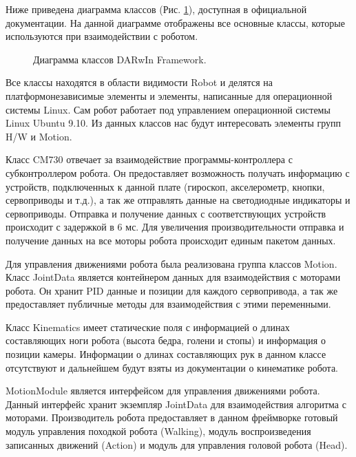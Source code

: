 Ниже приведена диаграмма классов (Рис. \ref{im:1_framework_class_diagram}), доступная в официальной документации. На данной диаграмме отображены все основные классы, которые используются при взаимодействии с роботом. %

\begin{figure}[h]
\caption{Диаграмма классов DARwIn Framework.}
\label{im:1_framework_class_diagram}
\end{figure}

Все классы находятся в области видимости Robot и делятся на платформонезависимые элементы и элементы, написанные для операционной системы Linux. Сам робот работает под управлением операционной системы Linux Ubuntu 9.10. Из данных классов нас будут интересовать элементы групп H/W и Motion.

Класс CM730 отвечает за взаимодействие программы-контроллера с субконтроллером робота. Он предоставляет возможность получать информацию с устройств, подключенных к данной плате (гироскоп, акселерометр, кнопки, сервоприводы и т.д.), а так же отправлять данные на светодиодные индикаторы и сервоприводы. Отправка и получение данных с соответствующих устройств происходит с задержкой в 6 мс. Для увеличения производительности отправка и получение данных на все моторы робота происходит единым пакетом данных.

Для управления движениями робота была реализована группа классов Motion. Класс JointData является контейнером данных для взаимодействия с моторами робота. Он хранит PID данные и позиции для каждого сервопривода, а так же предоставляет публичные методы для взаимодействия с этими переменными.

Класс Kinematics имеет статические поля с информацией о длинах составляющих ноги робота (высота бедра, голени и стопы) и информация о позиции камеры. Информации о длинах составляющих рук в данном классе отсутствуют и дальнейшем будут взяты из документации о кинематике робота. %

MotionModule является интерфейсом для управления движениями робота. Данный интерфейс хранит экземпляр JointData для взаимодействия алгоритма с моторами. Производитель робота предоставляет в данном фреймворке готовый модуль управления походкой робота (Walking), модуль воспроизведения записанных движений (Action) и модуль для управления головой робота (Head).

